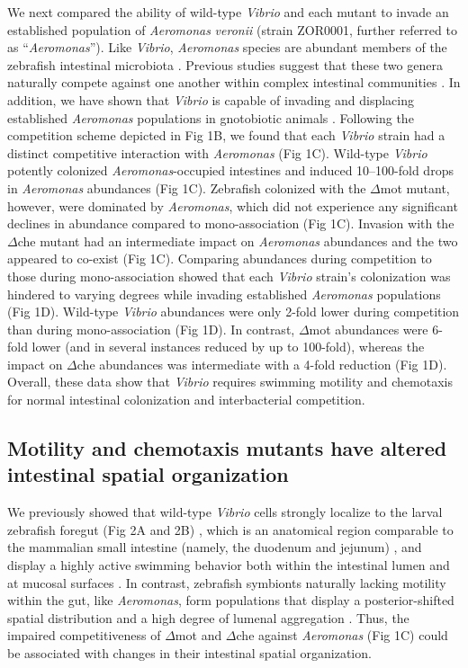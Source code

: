 {We next compared the ability of wild-type \textit{Vibrio} and each mutant to invade an established population of \textit{Aeromonas} \textit{veronii} (strain ZOR0001, further referred to as ``\textit{Aeromonas}''). Like \textit{Vibrio}, \textit{Aeromonas} species are abundant members of the zebrafish intestinal microbiota \cite{stephens_composition_2016}. Previous studies suggest that these two genera naturally compete against one another within complex intestinal communities \cite{phelps_microbial_2017}. In addition, we have shown that \textit{Vibrio} is capable of invading and displacing established \textit{Aeromonas} populations in gnotobiotic animals \cite{wiles_host_2016}. Following the competition scheme depicted in Fig 1B, we found that each \textit{Vibrio} strain had a distinct competitive interaction with \textit{Aeromonas} (Fig 1C). Wild-type \textit{Vibrio} potently colonized \textit{Aeromonas}-occupied intestines and induced 10–100-fold drops in \textit{Aeromonas} abundances (Fig 1C). Zebrafish colonized with the $\Delta$mot mutant, however, were dominated by \textit{Aeromonas}, which did not experience any significant declines in abundance compared to mono-association (Fig 1C). Invasion with the $\Delta$che mutant had an intermediate impact on \textit{Aeromonas} abundances and the two appeared to co-exist (Fig 1C). Comparing abundances during competition to those during mono-association showed that each \textit{Vibrio} strain's colonization was hindered to varying degrees while invading established \textit{Aeromonas} populations (Fig 1D). Wild-type \textit{Vibrio} abundances were only 2-fold lower during competition than during mono-association (Fig 1D). In contrast, $\Delta$mot abundances were 6-fold lower (and in several instances reduced by up to 100-fold), whereas the impact on $\Delta$che abundances was intermediate with a 4-fold reduction (Fig 1D). Overall, these data show that \textit{Vibrio} requires swimming motility and chemotaxis for normal intestinal colonization and interbacterial competition.


\subsection{Motility and chemotaxis mutants have altered intestinal spatial organization}
We previously showed that wild-type \textit{Vibrio} cells strongly localize to the larval zebrafish foregut (Fig 2A and 2B) \cite{schlomann_bacterial_2018}, which is an anatomical region comparable to the mammalian small intestine (namely, the duodenum and jejunum) \cite{lickwar_genomic_2017,wang_morphological_2010}, and display a highly active swimming behavior both within the intestinal lumen and at mucosal surfaces \cite{wiles_host_2016}. In contrast, zebrafish symbionts naturally lacking motility within the gut, like \textit{Aeromonas}, form populations that display a posterior-shifted spatial distribution and a high degree of lumenal aggregation \cite{schlomann_bacterial_2018,wiles_host_2016}. Thus, the impaired competitiveness of $\Delta$mot and $\Delta$che against \textit{Aeromonas} (Fig 1C) could be associated with changes in their intestinal spatial organization. 

}

